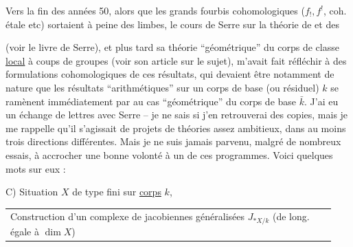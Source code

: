 
 Vers la fin des années 50, alors que les grands fourbis cohomologiques ($f_{!},f^{!}$, coh. étale etc) sortaient à peine des limbes, le cours de Serre sur la théorie de  et  des 

  (voir le livre de Serre), et plus tard sa théorie ``géométrique'' du corps de classe \uline{local} à coups de groupes  (voir son article sur le sujet), m'avait fait réfléchir à des formulations cohomologiques de ces résultats, qui devaient être notamment de nature  que les résultats ``arithmétiques'' sur un corps de base (ou résiduel) $k$  se ramènent immédiatement par  au cas ``géométrique'' du corps de base $\bar{k}$. J'ai eu un échange de lettres avec Serre -- je ne sais si j'en retrouverai des copies, mais je me rappelle qu'il s'agissait de projets de théories assez ambitieux,  dans au moins trois directions différentes. Mais je ne suis jamais parvenu, malgré de nombreux essais, à accrocher une bonne volonté à un de ces programmes. Voici quelques mots sur eux :

C) Situation $X$ de type fini sur \uline{corps} $k$,

\noindent\begin{tabular}{@{}|p{0.94\linewidth}@{}}
Construction d'un complexe de jacobiennes généralisées $J_{*X/k}$ (de long. égale à $\dim X$)
\end{tabular}

